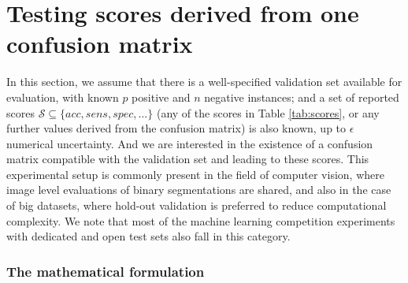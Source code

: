 \documentclass[5p, final]{elsarticle}
\begin{document}


\section{Testing scores derived from one confusion matrix}
\label{sec:ind}

In this section, we assume that there is a well-specified validation set available for evaluation, with known $p$ positive and $n$ negative instances; and a set of reported scores $\mathcal{S}\subseteq\lbrace acc, sens, spec, \dots\rbrace$ (any of the scores in Table \ref{tab:scores}, or any further values derived from the confusion matrix) is also known, up to $\epsilon$ numerical uncertainty. And we are interested in the existence of a confusion matrix compatible with the validation set and leading to these scores. This experimental setup is commonly present in the field of computer vision, where image level evaluations of binary segmentations are shared, and also in the case of big datasets, where hold-out validation is preferred to reduce computational complexity. We note that most of the machine learning competition experiments with dedicated and open test sets also fall in this category.

\subsubsection{The mathematical formulation}
\label{sec:rommat}
\end{document}
